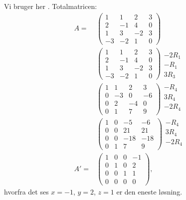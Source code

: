 		Vi bruger her \cite[Sætning 1.2.18]{hesselholt2017}. Totalmatricen:
			\begin{align*}
				A=&\left(\begin{array}{rrr|r} {1} & {1} & {2} & {3} \\ {2} & {-1} & {4} & {0} \\ {1} & {3} & {-2} & {3} \\ {-3} & {-2} & {1} & {0} \end{array}\right)\\
				&\left(\begin{array}{rrr|r} {1} & {1} & {2} & {3} \\ {2} & {-1} & {4} & {0} \\ {1} & {3} & {-2} & {3} \\ {-3} & {-2} & {1} & {0} \end{array}\right)\begin{array}{c} \, \\ -2R_1 \\ -R_1 \\ 3R_3 \end{array}\\
				&\left(\begin{array}{rrr|r} {1} & {1} & {2} & {3} \\ {0} & {-3} & {0} & {-6} \\ {0} & {2} & {-4} & {0} \\ {0} & {1} & {7} & {9} \end{array}\right)\begin{array}{c} -R_4 \\ 3R_4 \\ -2R_4 \\ \, \end{array}\\
				&\left(\begin{array}{rrr|r} {1} & {0} & {-5} & {-6} \\ {0} & {0} & {21} & {21} \\ {0} & {0} & {-18} & {-18} \\ {0} & {1} & {7} & {9} \end{array}\right)\begin{array}{c} -R_4 \\ 3R_4 \\ -2R_4 \\ \, \end{array}\\
				A'=&\left(\begin{array}{rrr|r} {1} & {0} & {0} & {-1} \\ {0} & {1} & {0} & {2} \\ {0} & {0} & {1} & {1} \\ {0} & {0} & {0} & {0}\end{array}\right),
			\end{align*} 
		hvorfra det ses $x=-1$, $y=2$, $z=1$ er den eneste løsning.

